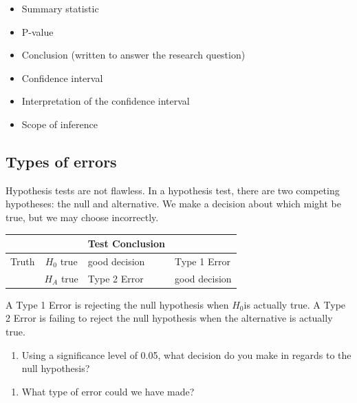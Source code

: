 \documentclass[
]{report}
\providecommand{\tightlist}{%
  \setlength{\itemsep}{0pt}\setlength{\parskip}{0pt}}
\begin{document}
\begin{itemize}
\item
  Summary statistic
\item
  P-value
\item
  Conclusion (written to answer the research question)
\item
  Confidence interval
\item
  Interpretation of the confidence interval
\item
  Scope of inference
\end{itemize}

\vspace{3in}

\hypertarget{types-of-errors}{%
\subsection{Types of errors}\label{types-of-errors}}

Hypothesis tests are not flawless. In a hypothesis test, there are two competing hypotheses: the null and alternative. We make a decision about which might be true, but we may choose incorrectly.

\begin{longtable}[]{@{}ccll@{}}
\toprule
& & Test Conclusion &\tabularnewline
\midrule
\endhead
Truth & \(H_0\) true & good decision & Type 1 Error\tabularnewline
& \(H_A\) true & Type 2 Error & good decision\tabularnewline
\bottomrule
\end{longtable}

A Type 1 Error is rejecting the null hypothesis when \(H_0\)is actually true. A Type 2 Error is failing to reject the null hypothesis when the alternative is actually true.

\begin{enumerate}
\def\labelenumi{\arabic{enumi}.}
\setcounter{enumi}{25}
\tightlist
\item
  Using a significance level of 0.05, what decision do you make in regards to the null hypothesis?
\end{enumerate}

\vspace{0.5in}

\begin{enumerate}
\def\labelenumi{\arabic{enumi}.}
\setcounter{enumi}{26}
\tightlist
\item
  What type of error could we have made?
\end{enumerate}

\vspace{0.5in}
\end{document}
